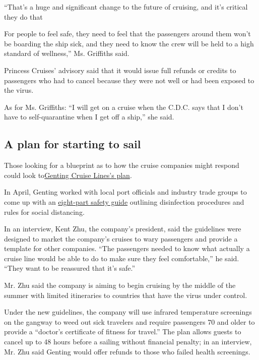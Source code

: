 ``That's a huge and significant change to the future of cruising, and
it's critical they do that

For people to feel safe, they need to feel that the passengers around
them won't be boarding the ship sick, and they need to know the crew
will be held to a high standard of wellness,'' Ms. Griffiths said.

Princess Cruises' advisory said that it would issue full refunds or
credits to passengers who had to cancel because they were not well or
had been exposed to the virus.

As for Ms. Griffiths: ``I will get on a cruise when the C.D.C. says that
I don't have to self-quarantine when I get off a ship,'' she said.

\hypertarget{a-plan-for-starting-to-sail}{%
\subsection{A plan for starting to
sail}\label{a-plan-for-starting-to-sail}}

Those looking for a blueprint as to how the cruise companies might
respond could look to\href{http://gentingcruiselines.com/}{Genting
Cruise Lines's plan}.

In April, Genting worked with local port officials and industry trade
groups to come up with an
\href{http://gentingcruiselines.com/media/1267/20200408-genting-cruise-lines-announces-enhanced-preventive-measures-setting-new-standards-for-the-fleet-and-the-cruise-industry.pdf}{eight-part
safety guide} outlining disinfection procedures and rules for social
distancing.

In an interview, Kent Zhu, the company's president, said the guidelines
were designed to market the company's cruises to wary passengers and
provide a template for other companies. ``The passengers needed to know
what actually a cruise line would be able to do to make sure they feel
comfortable,'' he said. ``They want to be reassured that it's safe.''

Mr. Zhu said the company is aiming to begin cruising by the middle of
the summer with limited itineraries to countries that have the virus
under control.

Under the new guidelines, the company will use infrared temperature
screenings on the gangway to weed out sick travelers and require
passengers 70 and older to provide a ``doctor's certificate of fitness
for travel.'' The plan allows guests to cancel up to 48 hours before a
sailing without financial penalty; in an interview, Mr. Zhu said Genting
would offer refunds to those who failed health screenings.

